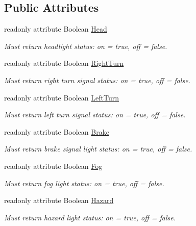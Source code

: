 \subsection*{Public Attributes}
\begin{DoxyCompactItemize}
\item 
readonly attribute Boolean \hyperlink{interfaceVehicle_1_1org_1_1automotive_1_1LightStatus_a6002dfa8db628803dcc7fd05d31e4ba3}{Head}
\begin{DoxyCompactList}\small\item\em Must return headlight status\-: on = true, off = false. \end{DoxyCompactList}\item 
readonly attribute Boolean \hyperlink{interfaceVehicle_1_1org_1_1automotive_1_1LightStatus_a5c3e638c041a733e1df0f38775192b49}{Right\-Turn}
\begin{DoxyCompactList}\small\item\em Must return right turn signal status\-: on = true, off = false. \end{DoxyCompactList}\item 
readonly attribute Boolean \hyperlink{interfaceVehicle_1_1org_1_1automotive_1_1LightStatus_af41a1c0b08bec3f53a4fab050c74238a}{Left\-Turn}
\begin{DoxyCompactList}\small\item\em Must return left turn signal status\-: on = true, off = false. \end{DoxyCompactList}\item 
readonly attribute Boolean \hyperlink{interfaceVehicle_1_1org_1_1automotive_1_1LightStatus_a60bfcf42172bd86ed2a95359e22d4293}{Brake}
\begin{DoxyCompactList}\small\item\em Must return brake signal light status\-: on = true, off = false. \end{DoxyCompactList}\item 
readonly attribute Boolean \hyperlink{interfaceVehicle_1_1org_1_1automotive_1_1LightStatus_a94effa671c405740b86c461844c19bd6}{Fog}
\begin{DoxyCompactList}\small\item\em Must return fog light status\-: on = true, off = false. \end{DoxyCompactList}\item 
readonly attribute Boolean \hyperlink{interfaceVehicle_1_1org_1_1automotive_1_1LightStatus_a5db8686f55c3a28a4b5bd2ffe0f083ad}{Hazard}
\begin{DoxyCompactList}\small\item\em Must return hazard light status\-: on = true, off = false. \end{DoxyCompactList}\item 

\end{DoxyCompactItemize}
